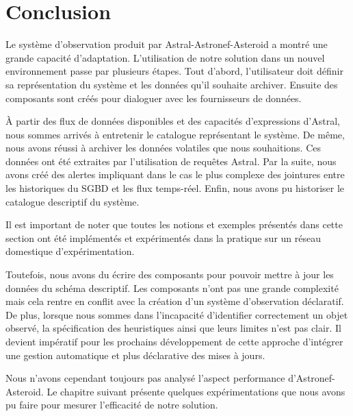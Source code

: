 \section{Conclusion}\label{sec:valid:domvision:conclusion}
Le système d'observation produit par Astral-Astronef-Asteroid a montré une grande capacité d'adaptation. L'utilisation de notre solution dans un nouvel environnement passe par plusieurs étapes. Tout d'abord, l'utilisateur doit définir sa représentation du système et les données qu'il souhaite archiver. Ensuite des composants sont créés pour dialoguer avec les fournisseurs de données.

À partir des flux de données disponibles et des capacités d'expressions d'Astral, nous sommes arrivés à entretenir le catalogue représentant le système. De même, nous avons réussi à archiver les données volatiles que nous souhaitions. Ces données ont été extraites par l'utilisation de requêtes Astral. Par la suite, nous avons créé des alertes impliquant dans le cas le plus complexe des jointures entre les historiques du SGBD et les flux temps-réel. Enfin, nous avons pu historiser le catalogue descriptif du système.

Il est important de noter que toutes les notions et exemples présentés dans cette section ont été implémentés et expérimentés dans la pratique sur un réseau domestique d'expérimentation.

Toutefois, nous avons du écrire des composants pour pouvoir mettre à jour les données du schéma descriptif. Les composants n'ont pas une grande complexité mais cela rentre en conflit avec la création d'un système d'observation déclaratif. De plus, lorsque nous sommes dans l'incapacité d'identifier correctement un objet observé, la spécification des heuristiques ainsi que leurs limites n'est pas clair. Il devient impératif pour les prochains développement de cette approche d'intégrer une gestion automatique et plus déclarative des mises à jours.

Nous n'avons cependant toujours pas analysé l'aspect performance d'Astronef-Asteroid. Le chapitre suivant présente quelques expérimentations que nous avons pu faire pour mesurer l'efficacité de notre solution.